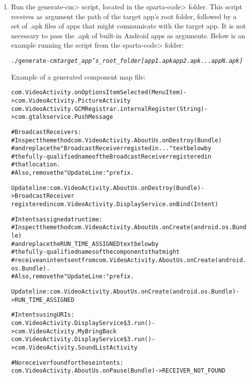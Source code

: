 \begin{enumerate}

\item
Run the \<generate-cm> script, located in the \<sparta-code> folder. This
script receives as argument the path of the target app's root folder,
followed by a set of .apk files of apps that might communicate with the target
app. It is not necessary to pass the .apk of built-in Android apps as arguments.
Below is an example running the script from the \<sparta-code> folder:
\bigskip

\begin{alltt}
./generate-cm \textit{target\_app's\_root\_folder} \textit{[app1.apk app2.apk ... appN.apk]}
\end{alltt}

\bigskip

Example of a generated component map file:
\bigskip

\begin{alltt}
com.VideoActivity.onOptionsItemSelected(MenuItem) -> com.VideoActivity.PictureActivity
com.VideoActivity.GCMRegistrar.internalRegister(String) -> com.gtalkservice.PushMessage

#Broadcast Receivers:
#Inspect the method com.VideoActivity.AboutUs.onDestroy(Bundle)
#and replace the "BroadcastReceiver registed in..." text below by
#the fully-qualified name of the BroadcastReceiver registered in
#that location. 
#Also, remove the "Update Line: " prefix.

Update line: com.VideoActivity.AboutUs.onDestroy(Bundle) -> BroadcastReceiver 
                     registered in com.VideoActivity.DisplayService.onBind(Intent)

#Intents assigned at run time:
#Inspect the method com.VideoActivity.AboutUs.onCreate(android.os.Bundle)
#and replace the RUN_TIME_ASSIGNED text below by 
#the fully-qualified names of the components that might 
#receive an intent sent from com.VideoActivity.AboutUs.onCreate(android.os.Bundle). 
#Also, remove the "Update Line: " prefix.

Update line: com.VideoActivity.AboutUs.onCreate(android.os.Bundle) -> RUN_TIME_ASSIGNED

#Intents using URIs:
com.VideoActivity.DisplayService\$3.run() -> com.VideoActivity.MyBringBack
com.VideoActivity.DisplayService\$3.run() -> com.VideoActivity.SoundListActivity

#No receiver found for these intents:
com.VideoActivity.AboutUs.onPause(Bundle) -> RECEIVER_NOT_FOUND
\end{alltt}


\end{enumerate}
